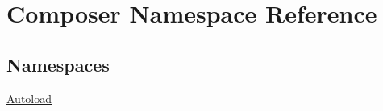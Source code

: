 \hypertarget{namespace_composer}{}\section{Composer Namespace Reference}
\label{namespace_composer}
\subsection*{Namespaces}
\begin{DoxyCompactItemize}
\item 
 \mbox{\hyperlink{namespace_composer_1_1_autoload}{Autoload}}
\end{DoxyCompactItemize}
